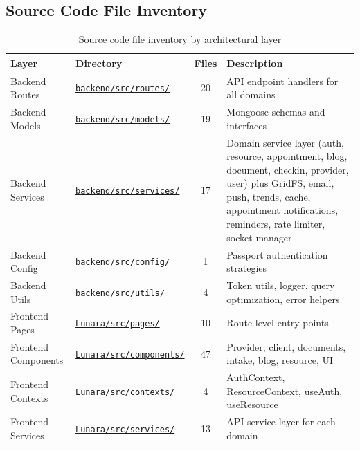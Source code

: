 \documentclass[12pt,letterpaper]{article}
\newcommand{\ghrepo}{https://github.com/omniV1/lunaraCare}
\begin{document}
\subsection{Source Code File Inventory}

\begin{table}[!htbp]
\centering
\small
\begin{tabularx}{\textwidth}{|l|l|c|>{\raggedright\arraybackslash}X|}
\hline
\rowcolor{TableHeader}\textcolor{TableHeaderText}{\textbf{Layer}} & \textcolor{TableHeaderText}{\textbf{Directory}} & \textcolor{TableHeaderText}{\textbf{Files}} & \textcolor{TableHeaderText}{\textbf{Description}} \\
\hline
Backend Routes & \href{\ghrepo/tree/main/backend/src/routes}{\texttt{backend/src/routes/}} & 20 & API endpoint handlers for all domains \\
\hline
\rowcolor{TableRowAlt}
Backend Models & \href{\ghrepo/tree/main/backend/src/models}{\texttt{backend/src/models/}} & 19 & Mongoose schemas and interfaces \\
\hline
Backend Services & \href{\ghrepo/tree/main/backend/src/services}{\texttt{backend/src/services/}} & 17 & Domain service layer (auth, resource, appointment, blog, document, checkin, provider, user) plus GridFS, email, push, trends, cache, appointment notifications, reminders, rate limiter, socket manager \\
\hline
\rowcolor{TableRowAlt}
Backend Config & \href{\ghrepo/tree/main/backend/src/config}{\texttt{backend/src/config/}} & 1 & Passport authentication strategies \\
\hline
Backend Utils & \href{\ghrepo/tree/main/backend/src/utils}{\texttt{backend/src/utils/}} & 4 & Token utils, logger, query optimization, error helpers \\
\hline
\rowcolor{TableRowAlt}
Frontend Pages & \href{\ghrepo/tree/main/Lunara/src/pages}{\texttt{Lunara/src/pages/}} & 10 & Route-level entry points \\
\hline
Frontend Components & \href{\ghrepo/tree/main/Lunara/src/components}{\texttt{Lunara/src/components/}} & 47 & Provider, client, documents, intake, blog, resource, UI \\
\hline
\rowcolor{TableRowAlt}
Frontend Contexts & \href{\ghrepo/tree/main/Lunara/src/contexts}{\texttt{Lunara/src/contexts/}} & 4 & AuthContext, ResourceContext, useAuth, useResource \\
\hline
Frontend Services & \href{\ghrepo/tree/main/Lunara/src/services}{\texttt{Lunara/src/services/}} & 13 & API service layer for each domain \\
\hline
\end{tabularx}
\caption{Source code file inventory by architectural layer}
\end{table}
\end{document}
